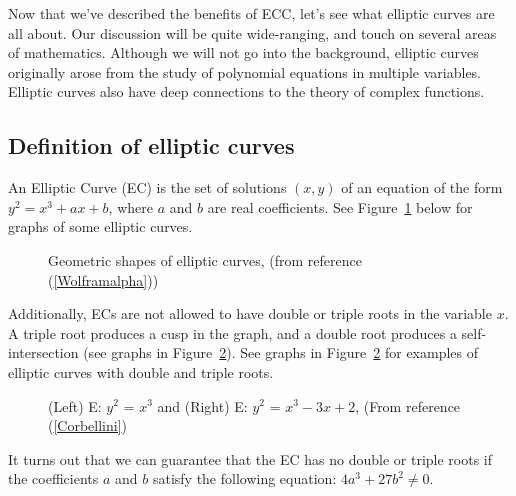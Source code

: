 Now that we've described the benefits of ECC, let's see what elliptic curves are all about. Our discussion will be quite wide-ranging, and touch on several areas of mathematics. Although we will not go into the background, elliptic curves originally arose from the study of polynomial equations in multiple variables. Elliptic curves also have deep connections to the theory of complex functions. 

\subsection{Definition of elliptic curves}
An Elliptic Curve (EC) is the set of solutions $(x,y)$ of  an equation of the form $y^2 = x^3 + ax + b$, where $a$ and $b$ are real coefficients.  See Figure~\ref{fig:DH:DHKE_5} below for graphs of some elliptic  curves.  
\begin{figure}[htbp]
	  \caption{\label{fig:DH:DHKE_5}  Geometric shapes of elliptic curves, (from reference (\ref{Wolframalpha}))}
\end{figure}
Additionally, ECs are not allowed to have double or triple roots in the variable $x$.  A triple root produces a cusp in the graph, and a double root produces a self-intersection (see graphs in Figure~\ref{fig:DH:DHKE_10}). See graphs in Figure~\ref{fig:DH:DHKE_10} for examples of elliptic curves with double and triple roots.
\begin{figure}[htbp]
	  \caption{\label{fig:DH:DHKE_10}(Left) E: $ y^2$ = $x^3$ and (Right) E: $ y^2$ = $x^3-3x+2$, (From reference (\ref{Corbellini})}
\end{figure}
 It turns out that we can guarantee that the EC has no double or triple roots if the coefficients $a$ and $b$ satisfy the following equation: $4a^3 + 27b^2 \neq 0$. 

